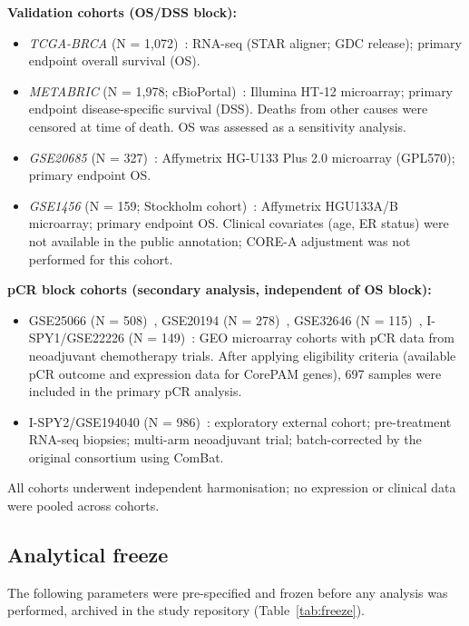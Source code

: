 \documentclass[referee,lineno,pdflatex,sn-vancouver-num]{sn-jnl}
\begin{document}
\textbf{Validation cohorts (OS/DSS block):}

\begin{itemize}
\item \textit{TCGA-BRCA} (N = 1,072)~\cite{tcga2012}: RNA-seq (STAR aligner; GDC release); primary endpoint overall survival (OS).
\item \textit{METABRIC} (N = 1,978; cBioPortal)~\cite{curtis2012}: Illumina HT-12 microarray; primary endpoint disease-specific survival (DSS). Deaths from other causes were censored at time of death. OS was assessed as a sensitivity analysis.
\item \textit{GSE20685} (N = 327)~\cite{kao2011}: Affymetrix HG-U133 Plus 2.0 microarray (GPL570); primary endpoint OS.
\item \textit{GSE1456} (N = 159; Stockholm cohort)~\cite{pawitan2005}: Affymetrix HGU133A/B microarray; primary endpoint OS. Clinical covariates (age, ER status) were not available in the public annotation; CORE-A adjustment was not performed for this cohort.
\end{itemize}

\textbf{pCR block cohorts (secondary analysis, independent of OS block):}

\begin{itemize}
\item GSE25066 (N = 508)~\cite{hatzis2011}, GSE20194 (N = 278)~\cite{maqc2010}, GSE32646 (N = 115)~\cite{miyake2012}, I-SPY1/GSE22226 (N = 149)~\cite{esserman2012}: GEO microarray cohorts with pCR data from neoadjuvant chemotherapy trials. After applying eligibility criteria (available pCR outcome and expression data for CorePAM genes), 697 samples were included in the primary pCR analysis.
\item I-SPY2/GSE194040 (N = 986)~\cite{wolf2022}: exploratory external cohort; pre-treatment RNA-seq biopsies; multi-arm neoadjuvant trial; batch-corrected by the original consortium using ComBat.
\end{itemize}

All cohorts underwent independent harmonisation; no expression or clinical data were pooled across cohorts.

\subsection{Analytical freeze}\label{subsec:analytical-freeze}

The following parameters were pre-specified and frozen before any analysis was performed, archived in the study repository (Table~\ref{tab:freeze}).
\end{document}
